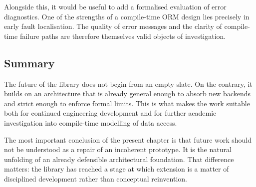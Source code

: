 Alongside this, it would be useful to add a formalised evaluation of error diagnostics. One of the strengths of a compile-time ORM design lies precisely in early fault localisation. The quality of error messages and the clarity of compile-time failure paths are therefore themselves valid objects of investigation.

\subsection{Summary}

The future of the library does not begin from an empty slate. On the contrary, it builds on an architecture that is already general enough to absorb new backends and strict enough to enforce formal limits. This is what makes the work suitable both for continued engineering development and for further academic investigation into compile-time modelling of data access.

The most important conclusion of the present chapter is that future work should not be understood as a repair of an incoherent prototype. It is the natural unfolding of an already defensible architectural foundation. That difference matters: the library has reached a stage at which extension is a matter of disciplined development rather than conceptual reinvention.
